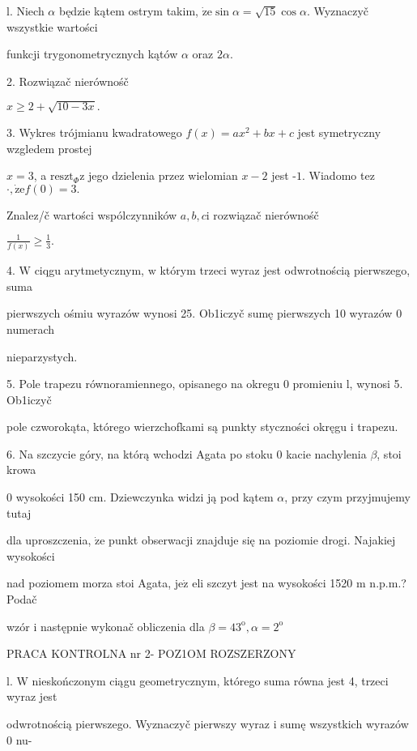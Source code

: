 \documentclass[a4paper,12pt]{article}
\begin{document}
l. Niech $\alpha$ będzie kątem ostrym takim, $\dot{\mathrm{z}}\mathrm{e}\sin\alpha=\sqrt{15}\cos\alpha$. Wyznaczyč wszystkie wartości

funkcji trygonometrycznych kątów $\alpha$ oraz $2\alpha.$

2. Rozwiązač nierównośč

$x\geq 2+\sqrt{10-3x}.$

3. Wykres trójmianu kwadratowego $f(x)=ax^{2}+bx+c$ jest symetryczny wzgledem prostej

$x=3$, a $\mathrm{r}\mathrm{e}\mathrm{s}\mathrm{z}\mathrm{t}_{\Phi}\mathrm{z}$ jego dzielenia przez wielomian $x-2$ jest -$1$. Wiadomo tez$\cdot, \dot{\mathrm{z}}\mathrm{e}f(0)=3.$

Znalez/č wartości wspólczynników $a, b, c\mathrm{i}$ rozwiązač nierównośč

$\displaystyle \frac{1}{f(x)}\geq\frac{1}{3}.$

4. $\mathrm{W}$ ciqgu arytmetycznym, $\mathrm{w}$ którym trzeci wyraz jest odwrotnością pierwszego, suma

pierwszych ośmiu wyrazów wynosi 25. Ob1iczyč sumę pierwszych 10 wyrazów $0$ numerach

nieparzystych.

5. Pole trapezu równoramiennego, opisanego na okregu $0$ promieniu l, wynosi 5. Ob1iczyč

pole czworokąta, którego wierzchofkami są punkty styczności okręgu $\mathrm{i}$ trapezu.

6. Na szczycie góry, na którą wchodzi Agata po stoku $0$ kacie nachylenia $\beta$, stoi krowa

$0$ wysokości 150 cm. Dziewczynka widzi ją pod kątem $\alpha$, przy czym przyjmujemy tutaj

dla uproszczenia, $\dot{\mathrm{z}}\mathrm{e}$ punkt obserwacji znajduje się na poziomie drogi. Najakiej wysokości

nad poziomem morza stoi Agata, $\mathrm{j}\mathrm{e}\dot{\mathrm{z}}$ eli szczyt jest na wysokości 1520 $\mathrm{m}$ n.p.m.? Podač

wzór $\mathrm{i}$ następnie wykonač obliczenia dla $\beta=43^{\mathrm{o}}, \alpha=2^{\mathrm{o}}$




PRACA KONTROLNA nr 2- POZ1OM ROZSZERZONY

l. W nieskończonym ciągu geometrycznym, którego suma równa jest 4, trzeci wyraz jest

odwrotnością pierwszego. Wyznaczyč pierwszy wyraz i sumę wszystkich wyrazów 0 nu-
\end{document}
